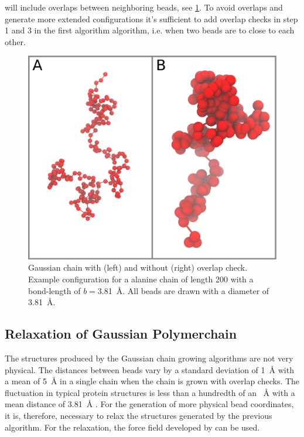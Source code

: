\documentclass[12pt, twoside]{report}
\begin{document}
will include overlaps between neighboring beads, see \cref{fig:configuration}.
To avoid overlaps and generate more extended configurations it's sufficient to
add overlap checks in step 1 and 3 in the first algorithm algorithm, i.e. when
two beads are to close to each other.
\begin{figure}[!ht] \centering
\includegraphics[width=.8\textwidth]{figures/configurations.pdf}
\caption[Example configuration generated for a Gaussian chain polymer model.]{
Gaussian chain with (left) and without (right) overlap check. Example
configuration for a alanine chain of length 200 with a bond-length of
$b=$\SI{3.81}{\AA}. All beads are drawn with a diameter of \SI{3.81}{\AA}.}
\label{fig:configuration}
\end{figure}

\subsection{Relaxation of Gaussian Polymerchain} The structures produced by
the Gaussian chain growing algorithms are not very physical. The distances
between beads vary by a standard deviation of \SI{1}{\AA} with a mean of
\SI{5}{\AA} in a single chain when the chain is grown with overlap checks. The
fluctuation in typical protein structures is less than a hundredth of an
\SI{}{\angstrom} with a mean distance of \SI{3.81}{\AA} \cite{Best2005}. For the
generation of more physical bead coordinates, it is, therefore, necessary to
relax the structures generated by the previous algorithm. For the relaxation,
the force field developed by \citet{Kim2008} can be used.
\end{document}
